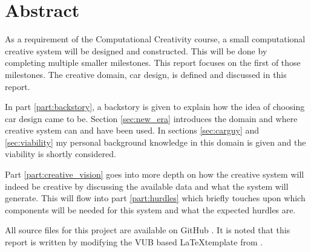 \chapter*{Abstract}
As a requirement of the Computational Creativity course, a small computational creative system will be designed and constructed.
This will be done by completing multiple smaller milestones.
This report focuses on the first of those milestones.
The creative domain, car design, is defined and discussed in this report.

In part \ref{part:backstory}, a backstory is given to explain how the idea of choosing car design came to be. Section \ref{sec:new_era} introduces the domain and where creative system can and have been used. In sections \ref{sec:carguy} and \ref{sec:viability} my personal background knowledge in this domain is given and the viability is shortly considered.

Part \ref{part:creative_vision} goes into more depth on how the creative system will indeed be creative by discussing the available data and what the system will generate. This will flow into part \ref{part:hurdles} which briefly touches upon which components will be needed for this system and what the expected hurdles are.

All source files for this project are available on GitHub \citep{github_project}. It is noted that this report is written by modifying the VUB based \LaTeX template from \citet{latex_template}. 